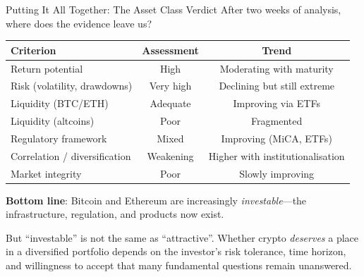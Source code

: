 \documentclass[10pt]{beamer}
\newcommand{\good}[1]{\textcolor{AccentGreen}{#1}}
\newcommand{\bad}[1]{\textcolor{AccentOrange}{#1}}
\begin{document}
\begin{frame}{Putting It All Together: The Asset Class Verdict}
  After two weeks of analysis, where does the evidence leave us?
  
  \vspace{0.5em}
  \begin{center}
    \small
    \begin{tabular}{lcc}
      \toprule
      \textbf{Criterion} & \textbf{Assessment} & \textbf{Trend} \\
      \midrule
      Return potential & \good{High} & Moderating with maturity \\
      Risk (volatility, drawdowns) & \bad{Very high} & Declining but still extreme \\
      Liquidity (BTC/ETH) & \good{Adequate} & Improving via ETFs \\
      Liquidity (altcoins) & \bad{Poor} & Fragmented \\
      Regulatory framework & Mixed & Improving (MiCA, ETFs) \\
      Correlation / diversification & \bad{Weakening} & Higher with institutionalisation \\
      Market integrity & \bad{Poor} & Slowly improving \\
      \bottomrule
    \end{tabular}
  \end{center}
  
  \vspace{0.5em}
  \textbf{Bottom line}: Bitcoin and Ethereum are increasingly \textit{investable}---the infrastructure, regulation, and products now exist. 
  \vspace{0.5em}
  
  But ``investable'' is not the same as ``attractive''. Whether crypto \textit{deserves} a place in a diversified portfolio depends on the investor's risk tolerance, time horizon, and willingness to accept that many fundamental questions remain unanswered.
\end{frame}
\end{document}

